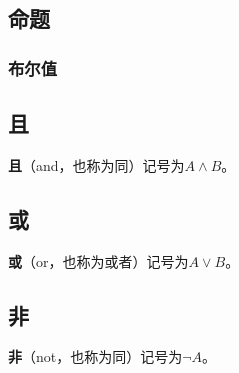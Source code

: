 
\begin{issues}
\issueDraft
\end{issues}
\subsection{命题}
\subsubsection{布尔值}
\subsection{且}
\textbf{且}（and，也称为同）记号为$A\land B$。
\subsection{或}
\textbf{或}（or，也称为或者）记号为$A\lor B$。
\subsection{非}
\textbf{非}（not，也称为同）记号为$\lnot A$。